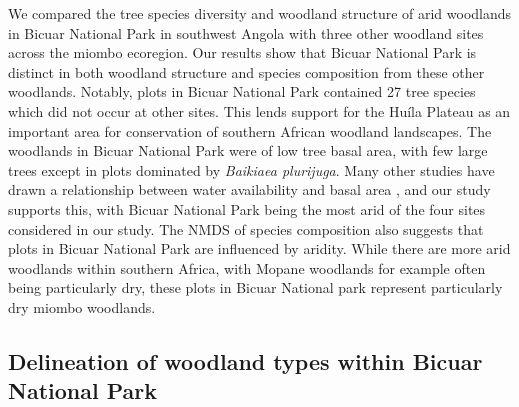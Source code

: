 \begin{refsection}
We compared the tree species diversity and woodland structure of arid woodlands in Bicuar National Park in southwest Angola with three other woodland sites across the miombo ecoregion. Our results show that Bicuar National Park is distinct in both woodland structure and species composition from these other woodlands. Notably, plots in Bicuar National Park contained 27 tree species which did not occur at other sites. This lends support for the Hu\'{i}la Plateau as an important area for conservation of southern African woodland landscapes. The woodlands in Bicuar National Park were of low tree basal area, with few large trees except in plots dominated by \textit{Baikiaea plurijuga}. Many other studies have drawn a relationship between water availability and basal area \citep{Terra2018, Strickland2016}, and our study supports this, with Bicuar National Park being the most arid of the four sites considered in our study. The NMDS of species composition also suggests that plots in Bicuar National Park are influenced by aridity. While there are more arid woodlands within southern Africa, with Mopane woodlands for example often being particularly dry, these plots in Bicuar National park represent particularly dry miombo woodlands.

\subsection{Delineation of woodland types within Bicuar National Park}
\label{bicuar:ssec:veg_type}


\end{refsection}
